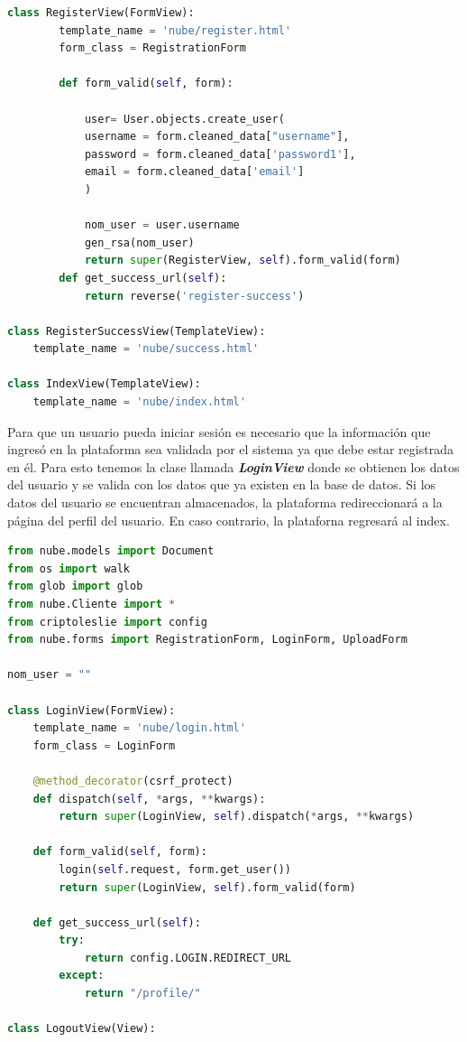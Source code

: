 \begin{lstlisting}[language=Python,frame=single, keywordstyle=\color{blue},breaklines=true]
	class RegisterView(FormView):
		template_name = 'nube/register.html'
		form_class = RegistrationForm

		def form_valid(self, form):

			user= User.objects.create_user(
			username = form.cleaned_data["username"],
			password = form.cleaned_data['password1'],
			email = form.cleaned_data['email']
			)

			nom_user = user.username
			gen_rsa(nom_user)
			return super(RegisterView, self).form_valid(form)
		def get_success_url(self):
			return reverse('register-success')

class RegisterSuccessView(TemplateView):
	template_name = 'nube/success.html'

class IndexView(TemplateView):
	template_name = 'nube/index.html'
\end{lstlisting}

Para que un usuario pueda iniciar sesión es necesario que la información que ingresó en la plataforma sea validada por el sistema ya que debe estar registrada en él.
Para esto tenemos la clase llamada \textbf{\textit{LoginView}} donde se obtienen los datos del usuario y se valida con los datos que ya existen en la base de datos. Si los datos del usuario se encuentran almacenados, la plataforma redireccionará a la página del perfil del usuario. En caso contrario, la plataforna regresará al index.

\begin{lstlisting}[language=Python,frame=single, keywordstyle=\color{blue},breaklines=true]
from nube.models import Document
from os import walk
from glob import glob
from nube.Cliente import *
from criptoleslie import config
from nube.forms import RegistrationForm, LoginForm, UploadForm

nom_user = ""

class LoginView(FormView):
	template_name = 'nube/login.html'
	form_class = LoginForm

	@method_decorator(csrf_protect)
	def dispatch(self, *args, **kwargs):
		return super(LoginView, self).dispatch(*args, **kwargs)

	def form_valid(self, form):
		login(self.request, form.get_user())
		return super(LoginView, self).form_valid(form)

	def get_success_url(self):
		try:
			return config.LOGIN.REDIRECT_URL
		except:
			return "/profile/"

class LogoutView(View):
\end{lstlisting}

